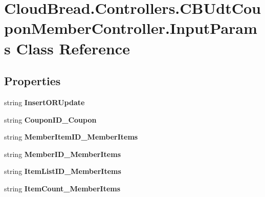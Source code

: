 \hypertarget{a00107}{}\section{Cloud\+Bread.\+Controllers.\+C\+B\+Udt\+Coupon\+Member\+Controller.\+Input\+Params Class Reference}
\label{a00107}
\subsection*{Properties}
\begin{DoxyCompactItemize}
\item 
string {\bfseries Insert\+O\+R\+Update}\hypertarget{a00107_ab92e7de3e231521eb00380a88b9e65c8}{}\label{a00107_ab92e7de3e231521eb00380a88b9e65c8}

\item 
string {\bfseries Coupon\+I\+D\+\_\+\+Coupon}\hypertarget{a00107_a1f5d32da0b5b102c52136376f52bb3e9}{}\label{a00107_a1f5d32da0b5b102c52136376f52bb3e9}

\item 
string {\bfseries Member\+Item\+I\+D\+\_\+\+Member\+Items}\hypertarget{a00107_af9408f792a3c30ad1f916257ac6c7631}{}\label{a00107_af9408f792a3c30ad1f916257ac6c7631}

\item 
string {\bfseries Member\+I\+D\+\_\+\+Member\+Items}\hypertarget{a00107_aca0afeb9e6990b4ff07049422fbf62a6}{}\label{a00107_aca0afeb9e6990b4ff07049422fbf62a6}

\item 
string {\bfseries Item\+List\+I\+D\+\_\+\+Member\+Items}\hypertarget{a00107_a6be35ca096d1e865a6867783311c3b4b}{}\label{a00107_a6be35ca096d1e865a6867783311c3b4b}

\item 
string {\bfseries Item\+Count\+\_\+\+Member\+Items}\hypertarget{a00107_ae494949c62bdb20ae2a32d14c739453b}{}\label{a00107_ae494949c62bdb20ae2a32d14c739453b}


\end{DoxyCompactItemize}
